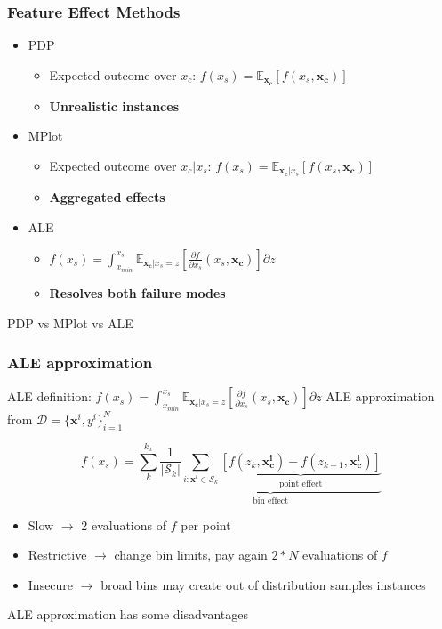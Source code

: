 \documentclass{beamer}
\newcommand{\xb}{\boldsymbol{x}}
\begin{document}
\begin{frame}
  \frametitle{Feature Effect Methods}
  \begin{itemize}
  \item<1-> PDP
    \begin{itemize}
    \item Expected outcome over \(x_c\): \(f(x_s) = \mathbb{E}_{\bm{x_c}}[f(x_s, \bm{x_c})]\)
    \item \textbf{Unrealistic instances}
    \end{itemize}

  \item<2-> MPlot
    \begin{itemize}
    \item Expected outcome over \(x_c|x_s\): \(f(x_s) = \mathbb{E}_{\bm{x_c}|x_s}[f(x_s, \bm{x_c})]\)
    \item \textbf{Aggregated effects}
    \end{itemize}

  \item<3-> ALE
    \begin{itemize}
    \item \(f(x_s) = \int_{x_{min}}^{x_s}\mathbb{E}_{\bm{x_c}|x_s=z}[ \frac{\partial f}{\partial x_s}(x_s, \bm{x_c})] \partial z\)
    \item \textbf{Resolves both failure modes}
    \end{itemize}

  \end{itemize}
  \noindent\makebox[\linewidth]{\rule{\paperwidth}{0.4pt}}
  PDP vs MPlot vs \alert{ALE}
\end{frame}


\begin{frame}
  \frametitle{ALE approximation}
  ALE definition: \( f(x_s) = \int_{x_{min}}^{x_s}\mathbb{E}_{\bm{x_c}|x_s=z}[ \frac{\partial f}{\partial x_s}(x_s, \bm{x_c})] \partial z \)
  \noindent\makebox[\linewidth]{\rule{\paperwidth}{0.4pt}}
  ALE approximation from \(\mathcal{D} = { \{\bm{x}^i, y^i}\}_{i=1}^N\)

    \[f(x_s) = \sum_k^{k_x} \underbrace{\frac{1}{|\mathcal{S}_k|} \sum_{i:\xb^i \in \mathcal{S}_k} \underbrace{[f(z_k, \bm{x^i_c}) - f(z_{k-1}, \bm{x^i_c})]}_{\text{point effect}}}_{\text{bin effect}} \]

    \begin{itemize}
    \item Slow \( \rightarrow \) 2 evaluations of \(f\) per point
    \item Restrictive \( \rightarrow\) change bin limits, pay again \(2*N\) evaluations of \(f\)
    \item Insecure \( \rightarrow\) broad bins may create out of distribution samples instances
    \end{itemize}

  \noindent\makebox[\linewidth]{\rule{\paperwidth}{0.4pt}}
  ALE approximation has some disadvantages
\end{frame}
\end{document}
